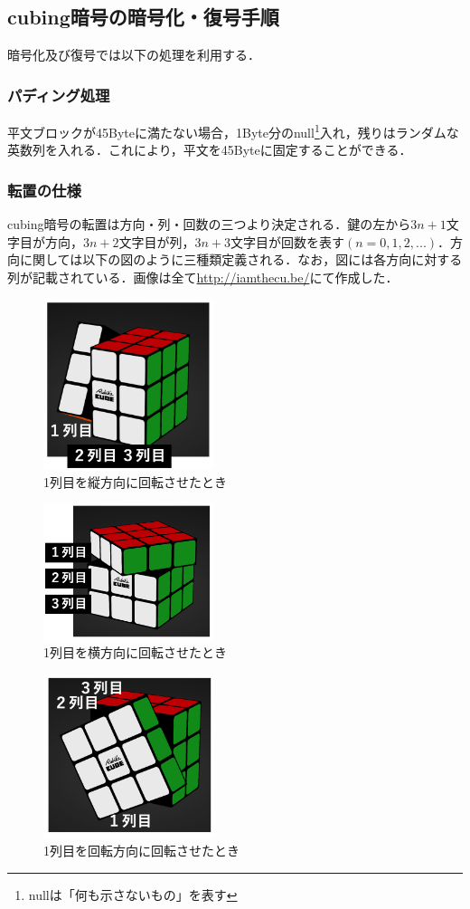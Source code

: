 \documentclass[titlepage]{jarticle}
\begin{document}
\subsection{cubing暗号の暗号化・復号手順}
暗号化及び復号では以下の処理を利用する．

\subsubsection{パディング処理}
平文ブロックが45Byteに満たない場合，1Byte分のnull\footnote{nullは「何も示さないもの」を表す}入れ，残りはランダムな英数列を入れる．これにより，平文を45Byteに固定することができる．

\subsubsection{転置の仕様}
cubing暗号の転置は方向・列・回数の三つより決定される．鍵の左から\(3n+1\)文字目が方向，\(3n+2\)文字目が列，\(3n+3\)文字目が回数を表す\((n=0,1,2,...)\)．方向に関しては以下の図のように三種類定義される．なお，図には各方向に対する列が記載されている．画像は全て\url{http://iamthecu.be/}にて作成した．

\begin{figure}[htb]
  \centering
  \includegraphics[width=5cm]{./tex_pic/tate.jpg}
  \caption{1列目を縦方向に回転させたとき}
\end{figure}
\begin{figure}[htb]
  \centering
  \includegraphics[width=5cm]{./tex_pic/yoko.jpg}
  \caption{1列目を横方向に回転させたとき}
\end{figure}
\begin{figure}[!h]
  \centering
  \includegraphics[width=5cm]{./tex_pic/kai.jpg}
  \caption{1列目を回転方向に回転させたとき}
\end{figure}
\end{document}
